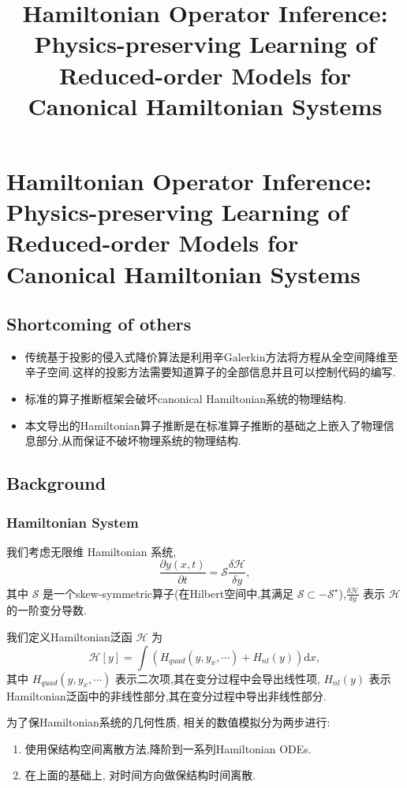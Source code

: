 \documentclass[11pt]{article}
\date{}
\title{Hamiltonian Operator Inference: Physics-preserving Learning of Reduced-order Models for Canonical Hamiltonian Systems}
\begin{document}
\maketitle
\section{Hamiltonian Operator Inference: Physics-preserving Learning of Reduced-order Models for Canonical Hamiltonian Systems}
\label{sec:org75a397e}
\subsection{Shortcoming of others}
\label{sec:org6b30608}
\begin{itemize}
\item 传统基于投影的侵入式降价算法是利用辛Galerkin方法将方程从全空间降维至辛子空间.这样的投影方法需要知道算子的全部信息并且可以控制代码的编写.
\item 标准的算子推断框架会破坏canonical Hamiltonian系统的物理结构.
\item 本文导出的Hamiltonian算子推断是在标准算子推断的基础之上嵌入了物理信息部分,从而保证不破坏物理系统的物理结构.
\end{itemize}
\subsection{Background}
\label{sec:orgb44ecf0}
\subsubsection{Hamiltonian System}
\label{sec:orgd9a34ce}
我们考虑无限维 Hamiltonian 系统,
\begin{equation}
\label{eq:1}
\frac{\partial y(x,t)}{\partial t}=\mathcal{S} \frac{\delta \mathcal{H}}{\delta y},
\end{equation}
其中 \(\mathcal{S}\) 是一个skew-symmetric算子(在Hilbert空间中,其满足 \(\mathcal{S}\subset-\mathcal{S}^{\star}\)),\(\frac{\delta \mathcal{H}}{\delta y}\) 表示 \(\mathcal{H}\) 的一阶变分导数.

我们定义Hamiltonian泛函 \(\mathcal{H}\) 为
\begin{equation}
\label{eq-Hamiltonianfunctional}
\mathcal{H}[y]=\int(H_{quad}(y,y_x,\cdots)+H_{nl}(y))\mathrm{d}x,
\end{equation}
其中 \(H_{quad}(y,y_x,\cdots)\) 表示二次项,其在变分过程中会导出线性项, \(H_{nl}(y)\) 表示Hamiltonian泛函中的非线性部分,其在变分过程中导出非线性部分.

为了保Hamiltonian系统的几何性质, 相关的数值模拟分为两步进行:
\begin{enumerate}
\item 使用保结构空间离散方法,降阶到一系列Hamiltonian ODEs.
\item 在上面的基础上, 对时间方向做保结构时间离散.
\end{enumerate}
\end{document}
